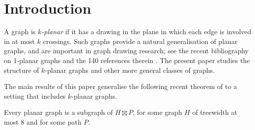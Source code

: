 \documentclass{patmorin}
\newcommand{\notex}[2]{}
\renewcommand{\le}{\leqslant}
\begin{document}
\section{Introduction}
\label{Introduction}

A graph is \emph{$k$-planar} if it has a drawing in the plane in which each edge is involved in at most $k$ crossings. Such graphs provide a natural generalisation of planar graphs, and are important in graph drawing research; see the recent bibliography on 1-planar graphs and the 140 references therein \citep{kobourov.liotta.ea:annotated}. The present paper studies the structure of $k$-planar graphs and other more general classes of graphs. 
\notex{PM}{I removed the following sentences because neither Vida nor could find anything about $k$-planar graphs in \cite{FP08} and, in any case, the proof is easy.  This could easily upset a referee.
Various structural results about planar graphs generalise for $k$-planar graphs. For example, \citet{FP08} generalised the Lipton-Tarjan separator theorem to show that every $k$-planar graph with $n$ vertices has a balanced separator of order $O(\sqrt{kn})$.}
The main results of this paper generalise the following recent theorem of \citet{dujmovic.joret.ea:planar} to a setting that includes $k$-planar graphs.

\begin{thm} 
\label{PlanarBasic}
Every planar graph is a subgraph of $H\boxtimes P$, for some graph $H$ of treewidth at most $8$ and for some path $P$. 
\end{thm}
\end{document}
